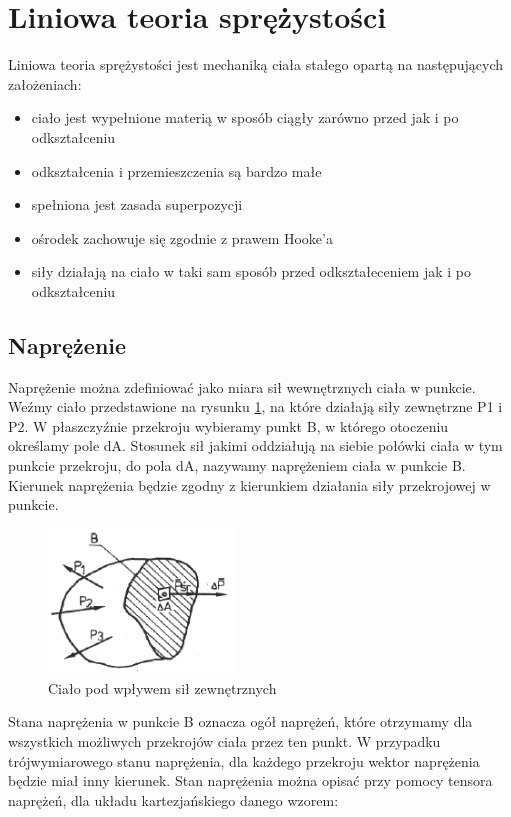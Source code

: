 
\section{Liniowa teoria sprężystości}
\label{sec:liniowa_teoria_sprezystosci}

Liniowa teoria sprężystości jest mechaniką ciała stałego opartą na następujących założeniach:
\begin{itemize}
  \item ciało jest wypełnione materią w sposób ciągły zarówno przed jak i po odkształceniu
  \item odkształcenia i przemieszczenia są bardzo małe
  \item spełniona jest zasada superpozycji
  \item ośrodek zachowuje się zgodnie z prawem Hooke'a
  \item siły działają na ciało w taki sam sposób przed odkształeceniem jak i po odkształceniu
\end{itemize}

\subsection{Naprężenie}
\label{sec:naprezenie}

Naprężenie można zdefiniować jako miara sił wewnętrznych ciała w punkcie. Weźmy ciało przedstawione na rysunku \ref{fig:potato}, na które działają siły zewnętrzne P1 i P2. W płaszczyźnie przekroju wybieramy punkt B, w którego otoczeniu określamy pole dA. Stosunek sił jakimi oddziałują na siebie połówki ciała w tym punkcie przekroju, do pola dA, nazywamy naprężeniem ciała w punkcie B. Kierunek naprężenia będzie zgodny z kierunkiem działania siły przekrojowej w punkcie.

\begin{figure}[h]
\centering
\includegraphics[width=5cm]{Zdjecia/2/potato}
\caption{Ciało pod wpływem sił zewnętrznych}
\label{fig:potato}
\end{figure}

Stana naprężenia w punkcie B oznacza ogół naprężeń, które otrzymamy dla wszystkich możliwych przekrojów ciała przez ten punkt.
W przypadku trójwymiarowego stanu naprężenia, dla każdego przekroju wektor naprężenia będzie miał inny kierunek. Stan naprężenia można opisać przy pomocy tensora naprężeń, dla układu kartezjańskiego danego wzorem:


